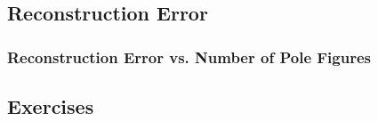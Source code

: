 



\subsection*{Reconstruction Error}

\begin{frame}
  \frametitle{Reconstruction Error vs. Number of Pole Figures}


\end{frame}

\subsection*{Exercises}


